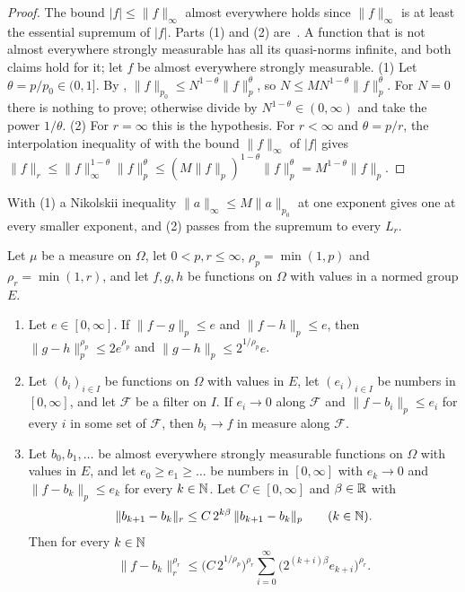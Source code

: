 \begin{proof}
\leanok
{}
The bound $|f| \leq \|f\|_\infty$ almost everywhere holds since $\|f\|_\infty$ is at least the
essential supremum of $|f|$. Parts (1) and (2) are~\cite[Theorem~2.1]{DitzianPrymak2016}. A
function that is not almost everywhere strongly measurable has all its quasi-norms infinite, and
both claims hold for it; let $f$ be almost everywhere strongly measurable. (1) Let
$\theta = p/p_0 \in (0, 1]$. By
, $\|f\|_{p_0} \leq N^{1-\theta} \|f\|_p^\theta$, so
$N \leq M N^{1-\theta} \|f\|_p^\theta$. For $N = 0$ there is nothing to prove; otherwise divide
by $N^{1-\theta} \in (0, \infty)$ and take the power $1/\theta$. (2) For $r = \infty$ this is
the hypothesis. For $r < \infty$ and $\theta = p/r$, the interpolation inequality of
 with the bound $\|f\|_\infty$ of $|f|$ gives
$\|f\|_r \leq \|f\|_\infty^{1-\theta} \|f\|_p^\theta
\leq (M \|f\|_p)^{1-\theta} \|f\|_p^\theta = M^{1-\theta} \|f\|_p$.
\end{proof}

With (1) a Nikolskii inequality $\|a\|_\infty \leq M \|a\|_{p_0}$ at one exponent gives one at
every smaller exponent, and (2) passes from the supremum to every $L_r$.

\begin{lemma}
\label{lem:near-best-transfer}
\leanok
Let $\mu$ be a measure on $\Omega$, let $0 < p, r \leq \infty$, $\rho_p = \min(1, p)$ and
$\rho_r = \min(1, r)$, and let $f, g, h$ be functions on $\Omega$ with values in a normed group
$E$.
\begin{enumerate}
  \item Let $e \in [0, \infty]$. If $\|f - g\|_p \leq e$ and $\|f - h\|_p \leq e$, then
    $\|g - h\|_p^{\rho_p} \leq 2 e^{\rho_p}$ and $\|g - h\|_p \leq 2^{1/\rho_p} e$.
  \item Let $(b_i)_{i \in I}$ be functions on $\Omega$ with values in $E$, let
    $(e_i)_{i \in I}$ be numbers in $[0, \infty]$, and let $\mathcal{F}$ be a filter on $I$. If
    $e_i \to 0$ along $\mathcal{F}$ and $\|f - b_i\|_p \leq e_i$ for every $i$ in some set of
    $\mathcal{F}$, then $b_i \to f$ in measure along $\mathcal{F}$.
  \item Let $b_0, b_1, \dots$ be almost everywhere strongly measurable functions on $\Omega$ with
    values in $E$, and let $e_0 \geq e_1 \geq \dots$ be numbers in $[0, \infty]$ with
    $e_k \to 0$ and $\|f - b_k\|_p \leq e_k$ for every $k \in \mathbb{N}$. Let $C \in [0, \infty]$ and
    $\beta \in \mathbb{R}$ with
    \[
      \|b_{k+1} - b_k\|_r \leq C \, 2^{k\beta} \, \|b_{k+1} - b_k\|_p
      \qquad (k \in \mathbb{N}).
    \]
    Then for every $k \in \mathbb{N}$
    \[
      \|f - b_k\|_r^{\rho_r} \leq \bigl( C \, 2^{1/\rho_p} \bigr)^{\rho_r}
        \sum_{i=0}^\infty \bigl( 2^{(k+i)\beta} e_{k+i} \bigr)^{\rho_r} .
    \]
\end{enumerate}
\end{lemma}

